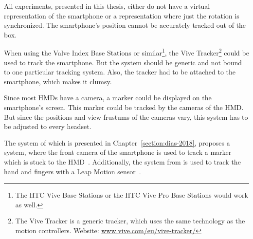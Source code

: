 All experiments, presented in this thesis, either do not have a virtual representation of the smartphone or a representation where just the rotation is synchronized. The smartphone's position cannot be accurately tracked out of the box. 

When using the Valve Index Base Stations or similar\footnote{The HTC Vive Base Stations or the HTC Vive Pro Base Stations would work as well.}, the Vive Tracker\footnote{The Vive Tracker is a generic tracker, which uses the same technology as the motion controllers. Website: \href{https://www.vive.com/eu/vive-tracker/}{www.vive.com/eu/vive-tracker/}} could be used to track the smartphone. But the system should be generic and not bound to one particular tracking system. Also, the tracker had to be attached to the smartphone, which makes it clumsy.

Since most \acp{HMD} have a camera, a marker could be displayed on the smartphone's screen. This marker could be tracked by the cameras of the \ac{HMD}. But since the positions and view frustums of the cameras vary, this system has to be adjusted to every headset.

The system of \citeauthor{Dias.2018} which is presented in Chapter~\ref{section:dias-2018}, proposes a system, where the front camera of the smartphone is used to track a marker which is stuck to the \ac{HMD}~\cite[4]{Dias.2018}. Additionally, the system from \citeauthor{Afonso.2017} is used to track the hand and fingers with a Leap Motion sensor~\cite[247]{Afonso.2017}.

